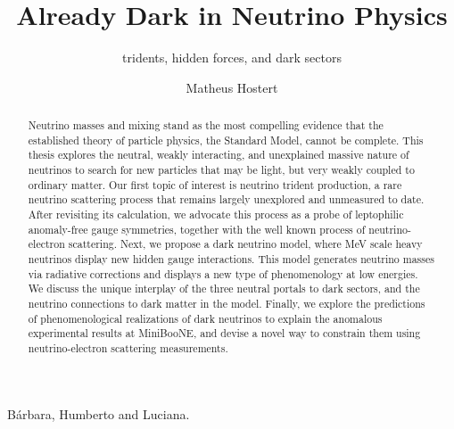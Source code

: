 \documentclass[openany,twoside,frontopenright,chaprunninghead]{ip3thesis}
\begin{document}
\title{Already Dark in Neutrino Physics}
\subtitle{tridents, hidden forces, and dark sectors}
\author{Matheus Hostert}
\maketitlepage*

\begin{abstract}
%
Neutrino masses and mixing stand as the most compelling evidence that the established theory of particle physics, the Standard Model, cannot be complete. This thesis explores the neutral, weakly interacting, and unexplained massive nature of neutrinos to search for new particles that may be light, but very weakly coupled to ordinary matter. Our first topic of interest is neutrino trident production, a rare neutrino scattering process that remains largely unexplored and unmeasured to date. After revisiting its calculation, we advocate this process as a probe of leptophilic anomaly-free gauge symmetries, together with the well known process of neutrino-electron scattering. Next, we propose a dark neutrino model, where MeV scale heavy neutrinos display new hidden gauge interactions. This model generates neutrino masses via radiative corrections and displays a new type of phenomenology at low energies. We discuss the unique interplay of the three neutral portals to dark sectors, and the neutrino connections to dark matter in the model. Finally, we explore the predictions of phenomenological realizations of dark neutrinos to explain the anomalous experimental results at MiniBooNE, and devise a novel way to constrain them using neutrino-electron scattering measurements.
%
\end{abstract}


\begin{dedication*}
%
B\'arbara, Humberto and Luciana.
%
\end{dedication*}

\disableprotrusion
\tableofcontents*
\listoffigures
\enableprotrusion
\end{document}
